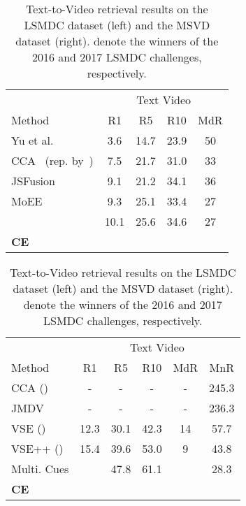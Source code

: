 \documentclass{bmvc2k}
\begin{document}
\begin{table}[ht]
\hspace{-0.6cm}
\begin{minipage}{0.52\linewidth}
\centering 
\scriptsize 
\setlength{\tabcolsep}{2pt}
\begin{tabular}{l | @{\hskip -0.2cm}c@{\hskip -0.35cm}c@{\hskip -0.35cm}c@{\hskip -0.1cm}c }
\hline \hline
\multicolumn{1}{c}{} & 
\multicolumn{4}{c}{Text  Video} \\
Method & R1 & R5 & R10 & MdR  \\ 
\hline 
Yu et al.~\cite{yu2016video} &3.6 & 14.7 & 23.9 & 50 \\
CCA~\cite{klein2015associating} (rep. by~\cite{miech2018learning}) &7.5 & 21.7 & 31.0 & 33  \\
JSFusion~\cite{yu2018joint}  & 9.1 & 21.2 & 34.1 & 36  \\
MoEE~\cite{miech2018learning} & 9.3 & 25.1 & 33.4 & 27 \\
~\cite{miech2018learning} & 10.1 & 25.6 & 34.6 & 27 \\
\textbf{CE} &  & 	&  & 	\\
\hline \hline
\end{tabular}
\end{minipage}
\begin{minipage}{0.4\linewidth}
\centering 
\scriptsize
\setlength{\tabcolsep}{4pt}
\begin{tabular}{l | @{\hskip -0.2cm}c@{\hskip -0.35cm}c@{\hskip -0.35cm}c@{\hskip -0.1cm}c@{\hskip -0.2cm}c } 
\hline \hline
\multicolumn{1}{c}{} & 
\multicolumn{5}{c}{Text  Video}  \\
Method & R1 & R5 & R10 & MdR & MnR  \\ 
\hline 
CCA (\cite{xu2015jointly}) & - & - & - & - & 245.3  \\
JMDV \cite{xu2015jointly} & - & - & - & - & 236.3  \\
VSE \cite{kiros2014unifying} (\cite{mithun2018learning}) & 12.3 & 30.1 & 42.3 & 14 & 57.7 \\
VSE++ \cite{faghri2017vse} (\cite{mithun2018learning}) & 15.4 & 39.6 & 53.0 & 9 & 43.8 \\
Multi. Cues \cite{mithun2018learning}  &  & 47.8 & 61.1 &  & 28.3 \\
\textbf{CE } & 	& 	& 	& 	&  \\
\hline \hline
\end{tabular}
\end{minipage}
\vspace{0.2cm}
\caption{Text-to-Video retrieval results on the LSMDC dataset (left) and the MSVD dataset (right).  denote the winners of the 2016 and 2017 LSMDC challenges, respectively.}
\label{table:LSMDC-MSVD} 
\end{table}
 
\end{document}
